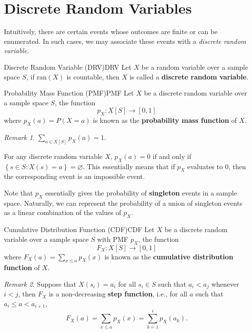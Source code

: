 \documentclass[math]{amznotes}
\theoremstyle{remark}
\newtheorem*{remark}{Remark}
\begin{document}
\section{Discrete Random Variables}
Intuitively, there are certain events whose outcomes are finite or can be enumerated. In such cases, we may associate these events with a \textit{discrete random variable}.
\begin{dfnbox}{Discrete Random Variable (DRV)}{DRV}
    Let $X$ be a random variable over a sample space $S$, if $\mathrm{ran}(X)$ is countable, then $X$ is called a {\color{red} \textbf{discrete random variable}}.
\end{dfnbox}
\begin{dfnbox}{Probability Mass Function (PMF)}{PMF}
    Let $X$ be a discrete random variable over a sample space $S$, the function
    \begin{displaymath}
        p_X \colon X[S] \to [0, 1]
    \end{displaymath}
    where $p_X(a) = P(X = a)$ is known as the {\color{red} \textbf{probability mass function}} of $X$.
\end{dfnbox}
\begin{notebox}
    \begin{remark}
        $\sum_{a \in X[S]} p_X(a) = 1$.
    \end{remark}
\end{notebox}
For any discrete random variable $X$, $p_X(a) = 0$ if and only if $\left\{s \in S \colon X(s) = a\right\} = \varnothing$. This essentially means that if $p_X$ evaluates to $0$, then the corresponding event is an impossible event.

Note that $p_X$ essentially gives the probability of \textbf{singleton} events in a sample space. Naturally, we can represent the probability of a union of singleton events as a linear combination of the values of $p_X$.
\begin{dfnbox}{Cumulative Distribution Function (CDF)}{CDF}
    Let $X$ be a discrete random variable over a sample space $S$ with PMF $p_X$, the function
    \begin{displaymath}
        F_X \colon X[S] \to [0, 1]
    \end{displaymath}
    where $F_X(a) = \sum_{x \leq a}p_X(x)$ is known as the {\color{red} \textbf{cumulative distribution function}} of $X$.
\end{dfnbox}
\begin{notebox}
    \begin{remark}
        Suppose that $X(s_i) = a_i$ for all $s_i \in S$ such that $a_i < a_j$ whenever $i < j$, then $F_X$ is a non-decreasing {\color{red} \textbf{step function}}, i.e., for all $a$ such that $a_i \leq a < a_{i + 1}$,
        \begin{equation*}
            F_X(a) = \sum_{x \leq a}p_X(x) = \sum_{k = 1}^{i}p_X(a_k).
        \end{equation*}
    \end{remark}
\end{notebox}
\end{document}
